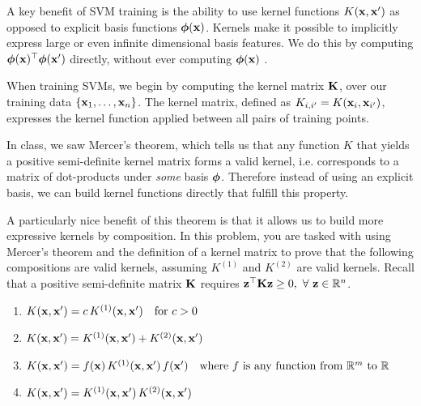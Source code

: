 \documentclass[submit]{harvardml}
\begin{document}
\newpage
\begin{problem}


  A key benefit of SVM training is the ability to use kernel functions
  $K(\mathbf{x}, \mathbf{x}')$ as opposed to explicit basis functions
  $\boldsymbol{\phi}(\mathbf{x})$. Kernels make it possible to implicitly express
  large or even infinite dimensional basis features. We do this 
  by computing $\boldsymbol{\phi}(\mathbf{x})^\top\boldsymbol{\phi}(\mathbf{x}')$ directly, without ever computing $\boldsymbol{\phi}(\mathbf{x})$ .

  When training SVMs, we begin by computing the kernel matrix $\mathbf{K}$,
  over our training data $\{\mathbf{x}_1, \ldots, \mathbf{x}_n\}$.  The kernel
  matrix, defined as $K_{i, i'} = K(\mathbf{x}_i, \mathbf{x}_{i'})$, expresses
  the kernel function applied between all pairs of training points.

  In class, we saw Mercer's theorem, which tells us that any function
  $K$ that yields a positive semi-definite kernel matrix forms a valid
  kernel, i.e. corresponds to a matrix of dot-products under
  \textit{some} basis $\boldsymbol{\phi}$. Therefore instead of using an explicit
  basis, we can build kernel functions directly that fulfill this
  property.

  A particularly nice benefit of this theorem is that it allows us to
  build more expressive kernels by composition.  In this problem, you
  are tasked with using Mercer's theorem and the definition of a
  kernel matrix to prove that the following  compositions are valid kernels, 
  assuming $K^{(1)}$ and $K^{(2)}$ are valid kernels. Recall that a positive semi-definite matrix $\mathbf{K}$ requires $\mathbf{z}^\top \mathbf{Kz} \geq 0,\ \forall\ \mathbf{z} \in \reals^n$.

  \begin{enumerate}
  \item $K(\mathbf{x}, \mathbf{x}') = c\,K^{(1)}(\mathbf{x}, \mathbf{x}') \quad \text{for $c>0$}$
  \item $ 	K(\mathbf{x}, \mathbf{x}')= K^{(1)}(\mathbf{x}, \mathbf{x}') + K^{(2)}(\mathbf{x}, \mathbf{x}')$
  \item   $ K(\mathbf{x}, \mathbf{x}') = f(\mathbf{x})\,K^{(1)}(\mathbf{x}, \mathbf{x}')\,f(\mathbf{x}') \quad
  \text{where $f$ is any function from~$\mathbb{R}^m$ to $\mathbb{R}$}$
  \item $ K(\mathbf{x}, \mathbf{x}') = K^{(1)}(\mathbf{x}, \mathbf{x}')\,K^{(2)}(\mathbf{x},
  \mathbf{x}')$


\end{enumerate}
\end{problem}
\end{document}
